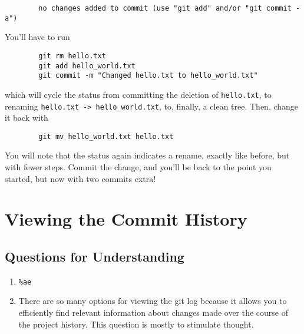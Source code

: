 \begin{enumerate}
\begin{verbatim}
        no changes added to commit (use "git add" and/or "git commit -a")
        \end{verbatim}
        You'll have to run
        \begin{verbatim}
        git rm hello.txt
        git add hello_world.txt
        git commit -m "Changed hello.txt to hello_world.txt"
        \end{verbatim}
        which will cycle the status from committing the deletion of
        \verb+hello.txt+, to renaming \verb+hello.txt -> hello_world.txt+,
        to, finally, a clean tree.
        Then, change it back with
        \begin{verbatim}
        git mv hello_world.txt hello.txt
        \end{verbatim}
        You will note that the status again indicates a rename, exactly like
        before, but with fewer steps.
        Commit the change, and you'll be back to the point you started, but
        now with two commits extra!
\end{enumerate}

\section{Viewing the Commit History}

\subsection{Questions for Understanding}
\begin{enumerate}
    \item \verb+%ae+
    \item There are so many options for viewing the git log because it 
        allows you to efficiently find relevant information about changes
        made over the course of the project history.
        This question is mostly to stimulate thought.
\end{enumerate}


